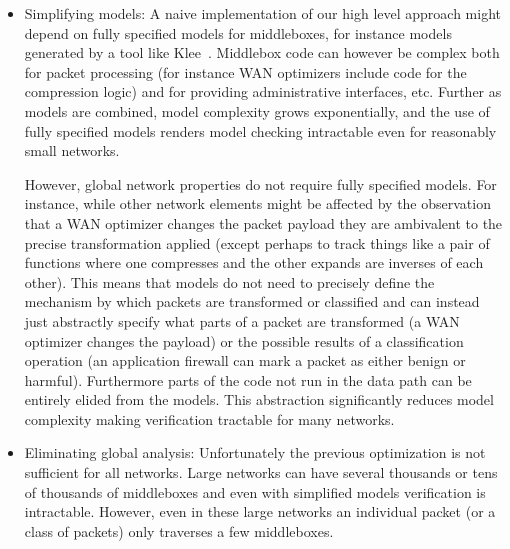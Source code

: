 \documentclass[letterpaper]{article}
\begin{document}
\begin{itemize}
\item Simplifying models:  A naive implementation of our high level approach might depend on fully specified models for middleboxes, for instance
models generated by a tool like Klee~\cite{cadar2008klee}. Middlebox code can however be complex both for packet
processing (for instance WAN optimizers include code for the compression logic) and for providing administrative
interfaces, etc. Further as models are combined, model complexity grows exponentially, and the use of fully specified
models renders model checking intractable even for reasonably small networks.

However, global network properties do not require fully specified models. For instance, while other
network elements might be affected by the observation that a WAN optimizer changes the packet payload they are
ambivalent to the precise transformation applied (except perhaps to track things like a pair of functions
where one compresses and the other expands are inverses of each other). This  means that models do not need to precisely
define the mechanism by which packets are transformed or classified and can instead just abstractly specify what parts of a
packet are transformed (a WAN optimizer changes the payload) or the possible results of a classification operation (an
application firewall can mark a packet as either benign or harmful). Furthermore parts of the code not run in
the data path can be entirely elided from the models. This abstraction significantly reduces model complexity making
verification tractable for many networks.

\item Eliminating global analysis:
Unfortunately the previous optimization is not sufficient for all networks. Large networks can have
several thousands or tens of thousands of middleboxes and even with simplified models verification is intractable. However, even
in these large networks an individual packet (or a class of packets) only traverses a few middleboxes.  


\end{itemize}
\end{document}
